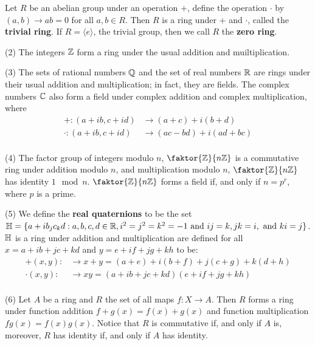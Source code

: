 \begin{example}\label{1.1}
  Let $R$ be an abelian group under an operation $+$, define the operation
  $\cdot$ by  $(a,b) \xrightarrow{} ab=0$ for all $a,b \in R$. Then $R$ is a
  ring under $+$ and  $\cdot$, called the  \textbf{trivial ring}. If
  $R=\langle e \rangle$, the trivial group, then we call $R$ the  \textbf{zero
  ring}.

\item[(2)] The integers $\mathbb{Z}$ form a ring under the usual addition and
  muiltiplication.

\item[(3)] The sets of rational numbers $\mathbb{Q}$ and the set of real numbers
  $\mathbb{R}$ are rings under their usual addition and multiplication; in fact,
  they are fields. The complex numbers $\mathbb{C}$ also form a field under
  complex addition and complex multiplication, where
  \begin{align*}
    +:(a+ib,c+id)   &   \xrightarrow{} (a+c)+i(b+d)   \\
    \cdot:(a+ib,c+id)   &   \xrightarrow{} (ac-bd)+i(ad+bc)   \\
  \end{align*}

\item[(4)] The factor group of integers modulo $n$, $\faktor{\Z}{n\Z}$ is a
  commutative ring under addition modulo $n$, and multiplication modulo
  $n$, $\faktor{\Z}{n\Z}$ has identity $1 \mod{n}$. $\faktor{\Z}{n\Z}$
  forms a field if, and only if $n=p^r$, where $p$ is a prime.

\item[(5)] We define the \textbf{real quaternions} to be the set
  $\mathbb{H}=\{a+ib_jc_kd : a,b,c,d \in \mathbb{R}, i^2=j^2=k^2=-1 \text{ and } ij=k,
  jk=i, \text{ and } ki=j\}$. $\mathbb{H}$ is a ring under addition and
  multiplication are defined for all $x=a+ib+jc+kd$ and $y=e+if+jg+kh$ to be:
  \begin{align*}
    +(x,y): &   \xrightarrow{} x+y=(a+e)+i(b+f)+j(c+g)+k(d+h)   \\
    \cdot(x,y):  &   \xrightarrow{} xy= (a+ib+jc+kd)(e+if+jg+kh) \\
  \end{align*}

\item[(6)] Let $A$ be a ring and $R$ the set of all maps $f:X \xrightarrow{}
  A$. Then $R$ forms a ring under function addition  $f+g(x)=f(x)+g(x)$ and
  function multiplication $fg(x)=f(x)g(x)$. Notice that $R$ is commutative if,
  and only if  $A$ is, moreover,  $R$ has identity if, and only if  $A$ has
  identity.


\end{example}
